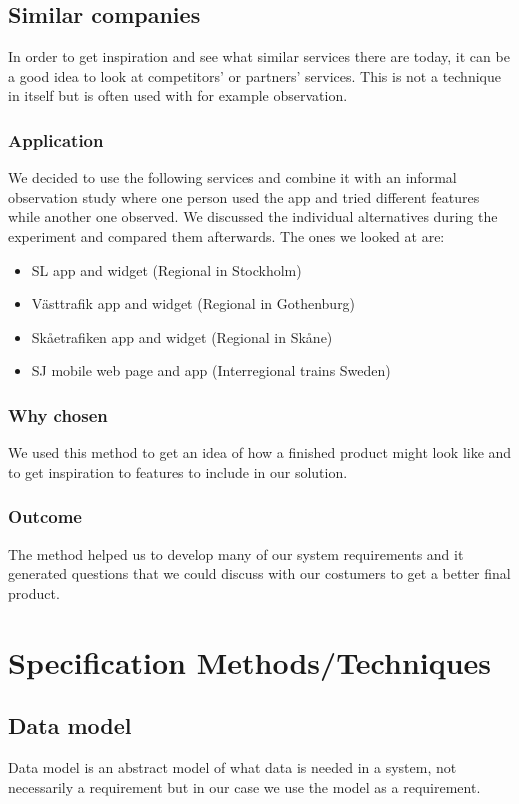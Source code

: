 \documentclass[a4paper]{article}
\begin{document}
    \subsection{Similar companies}
In order to get inspiration and see what similar services there are today, it can be a good idea to look at competitors' or partners' services. This is not a technique in itself but is often used with for example observation.

  
    \subsubsection{Application}
We decided to use the following services and combine it with an informal observation study where one person used the app and tried different features while another one observed. We discussed the individual alternatives during the experiment and compared them afterwards. The ones we looked at are:
\begin{itemize}
		\item SL app and widget (Regional in Stockholm)
		\item Västtrafik app and widget (Regional in Gothenburg)
		\item Skåetrafiken app and widget (Regional in Skåne)
		\item SJ mobile web page and app (Interregional trains Sweden)
	\end{itemize}
	
    \subsubsection{Why chosen}
We used this method to get an idea of how a finished product might look like
and to get inspiration to features to include in our solution.
    \subsubsection{Outcome}
The method helped us to develop many of our system requirements and it generated questions that we could discuss with our costumers to get a better final product.
	
	
	\section{Specification Methods/Techniques}
    \subsection{Data model}
Data model is an abstract model of what data is needed in a system, not necessarily a requirement but in our case we use the model as a requirement.
	
\end{document}
